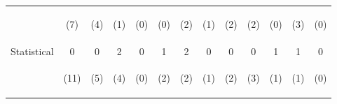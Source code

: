 \begin{tabular}{lcccccccccccc}
 & \begin{footnotesize}(7)\end{footnotesize} & \begin{footnotesize}(4)\end{footnotesize} & \begin{footnotesize}(1)\end{footnotesize} & \begin{footnotesize}(0)\end{footnotesize} & \begin{footnotesize}(0)\end{footnotesize} & \begin{footnotesize}(2)\end{footnotesize} & \begin{footnotesize}(1)\end{footnotesize} & \begin{footnotesize}(2)\end{footnotesize} & \begin{footnotesize}(2)\end{footnotesize} & \begin{footnotesize}(0)\end{footnotesize} & \begin{footnotesize}(3)\end{footnotesize} & \begin{footnotesize}(0)\end{footnotesize}\\
\noalign{\smallskip}Statistical & 0 & 0 & 2 & 0 & 1 & 2 & 0 & 0 & 0 & 1 & 1 & 0\\
 & \begin{footnotesize}(11)\end{footnotesize} & \begin{footnotesize}(5)\end{footnotesize} & \begin{footnotesize}(4)\end{footnotesize} & \begin{footnotesize}(0)\end{footnotesize} & \begin{footnotesize}(2)\end{footnotesize} & \begin{footnotesize}(2)\end{footnotesize} & \begin{footnotesize}(1)\end{footnotesize} & \begin{footnotesize}(2)\end{footnotesize} & \begin{footnotesize}(3)\end{footnotesize} & \begin{footnotesize}(1)\end{footnotesize} & \begin{footnotesize}(1)\end{footnotesize} & \begin{footnotesize}(0)\end{footnotesize}\\

\end{tabular}
